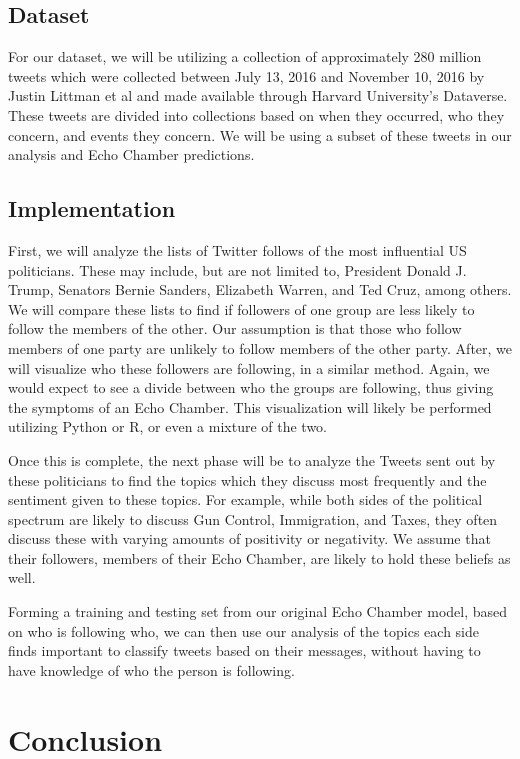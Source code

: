 \documentclass[journal]{IEEEtran}
\begin{document}
\subsection{Dataset}

For our dataset, we will be utilizing a collection of approximately 280 million tweets which were collected between July 13, 2016 and November 10, 2016 by Justin Littman et al and made available through Harvard University’s Dataverse. These tweets are divided into collections based on when they occurred, who they concern, and events they concern. We will be using a subset of these tweets in our analysis and Echo Chamber predictions. 

\subsection{Implementation}

First, we will analyze the lists of Twitter follows of the most influential US politicians. These may include, but are not limited to, President Donald J. Trump, Senators Bernie Sanders, Elizabeth Warren, and Ted Cruz, among others. We will compare these lists to find if followers of one group are less likely to follow the members of the other. Our assumption is that those who follow members of one party are unlikely to follow members of the other party. After, we will visualize who these followers are following, in a similar method. Again, we would expect to see a divide between who the groups are following, thus giving the symptoms of an Echo Chamber. This visualization will likely be performed utilizing Python or R, or even a mixture of the two. 

Once this is complete, the next phase will be to analyze the Tweets sent out by these politicians to find the topics which they discuss most frequently and the sentiment given to these topics. For example, while both sides of the political spectrum are likely to discuss Gun Control, Immigration, and Taxes, they often discuss these with varying amounts of positivity or negativity. We assume that their followers, members of their Echo Chamber, are likely to hold these beliefs as well. 

Forming a training and testing set from our original Echo Chamber model, based on who is following who, we can then use our analysis of the topics each side finds important to classify tweets based on their messages, without having to have knowledge of who the person is following. 

	
\section{Conclusion}
\end{document}
